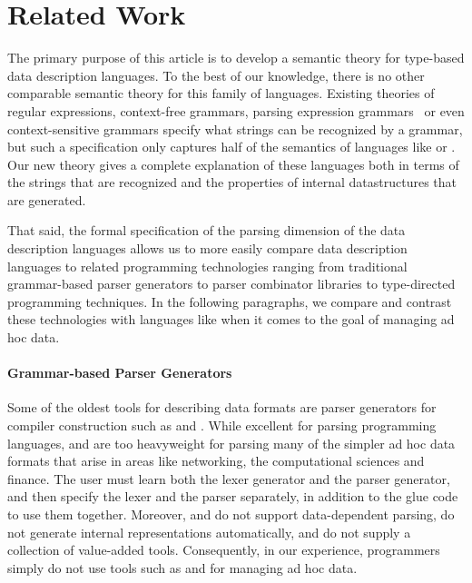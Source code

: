 \section{Related Work}
\label{sec:related}

The primary purpose of this article is to develop a semantic theory
for type-based data description languages.  To the best of our
knowledge, there is no other comparable semantic theory for this
family of languages.  Existing theories of regular expressions,
context-free grammars, parsing expression
grammars~\cite{birman+:parsing,ford:pegs,ford:packrat,grimm:packrat}
or even context-sensitive grammars specify what strings can be
recognized by a grammar, but such a specification 
only captures half of the semantics of
languages like \pads{} or \packettypes{}.  Our new theory gives a
complete explanation of these languages both in terms of the strings
that are recognized and the properties of internal datastructures that
are generated.

That said, the formal specification of the parsing dimension of the data description languages allows us to more easily compare data description languages to related programming technologies ranging from traditional grammar-based parser generators to parser combinator libraries to type-directed programming techniques.  In the following paragraphs, we compare and contrast these technologies with languages like \pads{} when it comes to the goal of managing ad hoc data.


\paragraph*{Grammar-based Parser Generators}

Some of the oldest tools for describing data formats are parser
generators for compiler construction such as \lex{} and \yacc{}. While
excellent for parsing programming languages, \lex{} and \yacc{} are
too heavyweight for parsing many of the simpler ad hoc data formats
that arise in areas like networking, the computational sciences and
finance. The user must learn both the lexer generator and the parser
generator, and then specify the lexer and the parser separately, in
addition to the glue code to use them together.  Moreover, \lex{}
and \yacc{} do not support data-dependent parsing, do not generate
internal representations automatically, and do not supply a collection
of value-added tools.  Consequently, in our experience,
programmers simply do not use tools such as \lex{} and \yacc{}
for managing ad hoc data.

